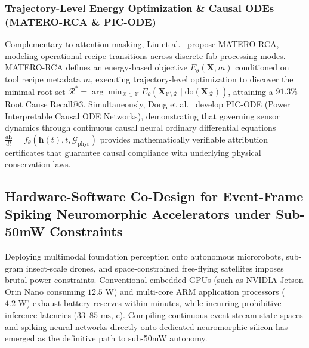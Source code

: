 \subsubsection{Trajectory-Level Energy Optimization \& Causal ODEs (MATERO-RCA \& PIC-ODE)}
Complementary to attention masking, Liu et al.~\cite{Liu2026MATERO} propose MATERO-RCA, modeling operational recipe transitions across discrete fab processing modes. MATERO-RCA defines an energy-based objective $E_\theta(\mathbf{X}, m)$ conditioned on tool recipe metadata $m$, executing trajectory-level optimization to discover the minimal root set $\mathcal{R}^* = \arg\min_{\mathcal{R} \subset \mathcal{V}} E_\theta(\mathbf{X}_{\mathcal{V} \setminus \mathcal{R}} \mid \text{do}(\mathbf{X}_{\mathcal{R}}))$, attaining a $91.3\%$ Root Cause Recall@3. Simultaneously, Dong et al.~\cite{Dong2026PICODE} develop PIC-ODE (Power Interpretable Causal ODE Networks), demonstrating that governing sensor dynamics through continuous causal neural ordinary differential equations $\frac{d\mathbf{h}}{dt} = f_\theta(\mathbf{h}(t), t, \mathcal{G}_{\text{phys}})$ provides mathematically verifiable attribution certificates that guarantee causal compliance with underlying physical conservation laws.

\subsection{Hardware-Software Co-Design for Event-Frame Spiking Neuromorphic Accelerators under Sub-50mW Constraints}
\label{sec:neuromorphic_hardware_accelerator}
Deploying multimodal foundation perception onto autonomous microrobots, sub-gram insect-scale drones, and space-constrained free-flying satellites imposes brutal power constraints. Conventional embedded GPUs (such as NVIDIA Jetson Orin Nano consuming $12.5\text{ W}$) and multi-core ARM application processors ($4.2\text{ W}$) exhaust battery reserves within minutes, while incurring prohibitive inference latencies ($33$--$85\text{ ms}$, c). Compiling continuous event-stream state spaces and spiking neural networks directly onto dedicated neuromorphic silicon has emerged as the definitive path to sub-50mW autonomy.

